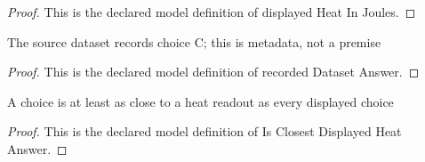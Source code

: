\begin{proof}
  This is the declared model definition of displayed Heat In Joules.
\end{proof}
\begin{definition}
  \label{def:physics:phyx-mini-0416:phyxminiproblems-problemphyxmini0416-recordeddatasetanswer}
  The source dataset records choice C; this is metadata, not a premise
\end{definition}
\begin{proof}
  This is the declared model definition of recorded Dataset Answer.
\end{proof}
\begin{definition}
  \label{def:physics:phyx-mini-0416:phyxminiproblems-problemphyxmini0416-isclosestdisplayedheatanswer}
  A choice is at least as close to a heat readout as every displayed choice
\end{definition}
\begin{proof}
  This is the declared model definition of Is Closest Displayed Heat Answer.
\end{proof}
